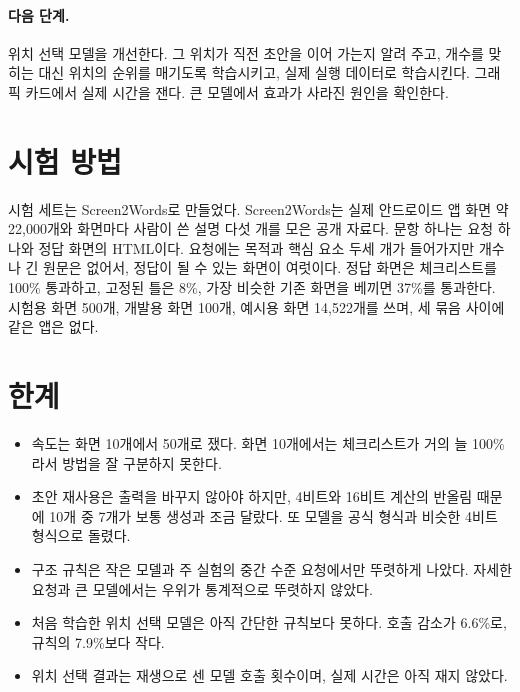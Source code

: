 \documentclass[10pt,a4paper]{article}
\begin{document}
\paragraph{다음 단계.} 위치 선택 모델을 개선한다. 그 위치가 직전 초안을 이어 가는지 알려 주고, 개수를 맞히는 대신 위치의 순위를 매기도록 학습시키고, 실제 실행 데이터로 학습시킨다. 그래픽 카드에서 실제 시간을 잰다. 큰 모델에서 효과가 사라진 원인을 확인한다.

\section{시험 방법}
시험 세트는 Screen2Words로 만들었다. Screen2Words는 실제 안드로이드 앱 화면 약 22{,}000개와 화면마다 사람이 쓴 설명 다섯 개를 모은 공개 자료다. 문항 하나는 요청 하나와 정답 화면의 HTML이다. 요청에는 목적과 핵심 요소 두세 개가 들어가지만 개수나 긴 원문은 없어서, 정답이 될 수 있는 화면이 여럿이다. 정답 화면은 체크리스트를 100\% 통과하고, 고정된 틀은 8\%, 가장 비슷한 기존 화면을 베끼면 37\%를 통과한다. 시험용 화면 500개, 개발용 화면 100개, 예시용 화면 14{,}522개를 쓰며, 세 묶음 사이에 같은 앱은 없다.

\section{한계}
\begin{itemize}[itemsep=1pt]
\item 속도는 화면 10개에서 50개로 쟀다. 화면 10개에서는 체크리스트가 거의 늘 100\%라서 방법을 잘 구분하지 못한다.
\item 초안 재사용은 출력을 바꾸지 않아야 하지만, 4비트와 16비트 계산의 반올림 때문에 10개 중 7개가 보통 생성과 조금 달랐다. 또 모델을 공식 형식과 비슷한 4비트 형식으로 돌렸다.
\item 구조 규칙은 작은 모델과 주 실험의 중간 수준 요청에서만 뚜렷하게 나았다. 자세한 요청과 큰 모델에서는 우위가 통계적으로 뚜렷하지 않았다.
\item 처음 학습한 위치 선택 모델은 아직 간단한 규칙보다 못하다. 호출 감소가 6.6\%로, 규칙의 7.9\%보다 작다.
\item 위치 선택 결과는 재생으로 센 모델 호출 횟수이며, 실제 시간은 아직 재지 않았다.
\end{itemize}
\end{document}
